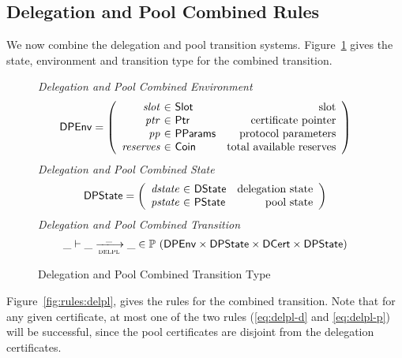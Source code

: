 \clearpage

\subsection{Delegation and Pool Combined Rules}
\label{sec:del-pool-rules}

We now combine the delegation and pool transition systems.
Figure~\ref{fig:defs:delpl} gives the state, environment and transition type for the
combined transition.

\begin{figure}[hbt]
  \emph{Delegation and Pool Combined Environment}
  \begin{equation*}
    \DPEnv =
    \left(
      \begin{array}{r@{~\in~}lr}
        \var{slot} & \Slot & \text{slot}\\
        \var{ptr} & \Ptr & \text{certificate pointer}\\
        \var{pp} & \PParams & \text{protocol parameters}\\
        \var{reserves} & \Coin & \text{total available reserves}
      \end{array}
    \right)
  \end{equation*}
  \emph{Delegation and Pool Combined State}
  \begin{equation*}
    \DPState =
    \left(
      \begin{array}{r@{~\in~}lr}
        \var{dstate} & \DState & \text{delegation state}\\
        \var{pstate} & \PState & \text{pool state}\\
      \end{array}
    \right)
  \end{equation*}
  \emph{Delegation and Pool Combined Transition}
  \begin{equation*}
    \_ \vdash \_ \trans{delpl}{\_} \_ \in
      \powerset (
        \DPEnv \times \DPState \times \DCert \times \DPState)
  \end{equation*}
  \caption{Delegation and Pool Combined Transition Type}
  \label{fig:defs:delpl}
\end{figure}

\clearpage

Figure~\ref{fig:rules:delpl}, gives the rules for the combined transition.
Note that for any given certificate, at most one of the two rules
(\cref{eq:delpl-d} and \cref{eq:delpl-p})
will be successful, since the pool certificates are disjoint from the delegation certificates.

